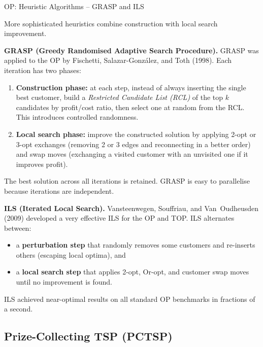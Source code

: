 \documentclass[aspectratio=169,10pt]{beamer}
\begin{document}
\begin{frame}[allowframebreaks]{OP: Heuristic Algorithms -- GRASP and ILS}

  More sophisticated heuristics combine construction with local search
  improvement.

  \medskip
  \textbf{GRASP (Greedy Randomised Adaptive Search Procedure).}
  GRASP was applied to the OP by Fischetti, Salazar-Gonz\'alez, and Toth
  (1998).
  Each iteration has two phases:
  \begin{enumerate}
    \item \textbf{Construction phase:} at each step, instead of always
          inserting the single best customer, build a \emph{Restricted
          Candidate List (RCL)} of the top $k$ candidates by profit/cost
          ratio, then select one at random from the RCL.
          This introduces controlled randomness.
    \item \textbf{Local search phase:} improve the constructed solution by
          applying 2-opt or 3-opt exchanges (removing 2 or 3 edges and
          reconnecting in a better order) and swap moves (exchanging a
          visited customer with an unvisited one if it improves profit).
  \end{enumerate}
  The best solution across all iterations is retained.
  GRASP is easy to parallelise because iterations are independent.

  \medskip
  \textbf{ILS (Iterated Local Search).}
  Vansteenwegen, Souffriau, and Van~Oudheusden (2009) developed a very
  effective ILS for the OP and TOP.
  ILS alternates between:
  \begin{itemize}
    \item a \textbf{perturbation step} that randomly removes some customers
          and re-inserts others (escaping local optima), and
    \item a \textbf{local search step} that applies 2-opt, Or-opt, and
          customer swap moves until no improvement is found.
  \end{itemize}
  ILS achieved near-optimal results on all standard OP benchmarks
  in fractions of a second.

\end{frame}

\subsection{Prize-Collecting TSP (PCTSP)}
\end{document}
